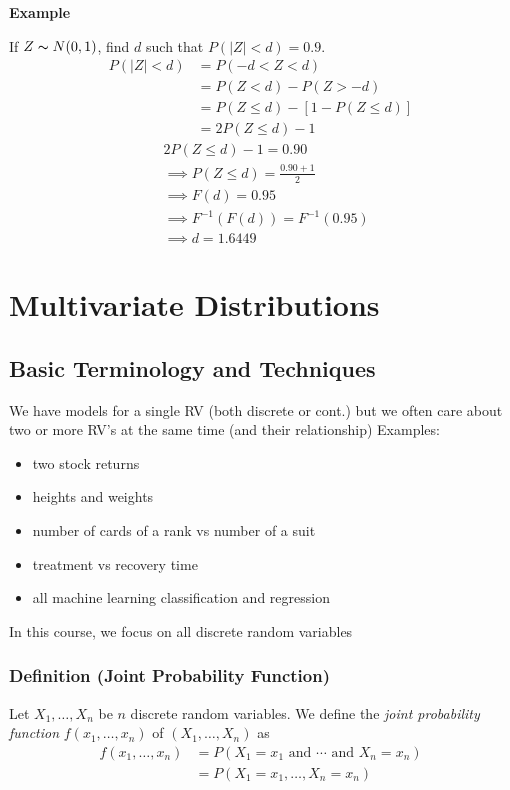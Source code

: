 \textbf{Example}

If $ Z \thicksim N(0,1) $, find $ d $ such that $ P(|Z|<d)=0.9 $.
\begin{align*}
    P(|Z|<d) & =P(-d<Z<d)                            \\
             & =P(Z<d)-P(Z>-d)                       \\
             & =P(Z\le d)-\left[ 1-P(Z\le d) \right] \\
             & =2P(Z\le d)-1
\end{align*}
\begin{align*}
     & 2P(Z\le d)-1=0.90                   \\
     & \implies P(Z\le d)=\frac{0.90+1}{2} \\
     & \implies F(d)=0.95                  \\
     & \implies F^{-1}(F(d))=F^{-1}(0.95)  \\
     & \implies d=1.6449
\end{align*}

\chapter{Multivariate Distributions}
\section{Basic Terminology and Techniques}
We have models for a single RV (both discrete or cont.) but we often
care about two or more RV's at the same time (and their relationship)
Examples:
\begin{itemize}
    \item two stock returns
    \item heights and weights
    \item number of cards of a rank vs number of a suit
    \item treatment vs recovery time
    \item all machine learning classification and regression
\end{itemize}
In this course, we focus on all discrete random variables

\begin{defbox}
    \subsection{Definition (Joint Probability Function)}
    Let $ X_1,\ldots,X_n $ be $ n $ discrete random variables.
    We define the \emph{joint probability function} $ f(x_1,\ldots,x_n) $ of
    $ (X_1,\ldots,X_n) $ as
    \begin{align*}
        f(x_1,\ldots,x_n) & =P(X_1=x_1 \text{ and } \cdots \text{ and } X_n=x_n) \\
                          & =P(X_1=x_1,\ldots,X_n=x_n)
    \end{align*}
\end{defbox}

